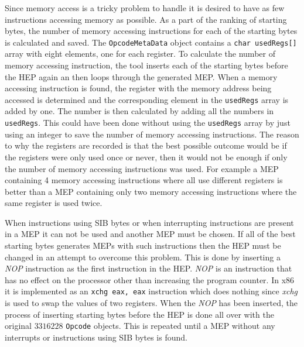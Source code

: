 \documentclass[11pt,twoside]{eitExjobb}
\begin{document}
\noindent Since memory access is a tricky problem to handle it is desired to have as few instructions accessing memory as possible. As a part of the ranking of starting bytes, the number of memory accessing instructions for each of the starting bytes is calculated and saved. The \texttt{OpcodeMetaData} object contains a \texttt{char usedRegs[]} array with eight elements, one for each register. To calculate the number of memory accessing instruction, the tool inserts each of the starting bytes before the HEP again an then loops through the generated MEP. When a memory accessing instruction is found, the register with the memory address being accessed is determined and the corresponding element in the \texttt{usedRegs} array is added by one. The number is then calculated by adding all the numbers in \texttt{usedRegs}. This could have been done without using the \texttt{usedRegs} array by just using an integer to save the number of memory accessing instructions. The reason to why the registers are recorded is that the best possible outcome would be if the registers were only used once or never, then it would not be enough if only the number of memory accessing instructions was used. For example a MEP containing 4 memory accessing instructions where all use different registers is better than a MEP containing only two memory accessing instructions where the same register is used twice.

When instructions using SIB bytes or when interrupting instructions are present in a MEP it can not be used and another MEP must be chosen. If all of the best starting bytes generates MEPs with such instructions then the HEP must be changed in an attempt to overcome this problem. This is done by inserting a \emph{NOP} instruction as the first instruction in the HEP. \emph{NOP} is an instruction that has no effect on the processor other than increasing the program counter. In x86 it is implemented as an \texttt{xchg eax, eax} instruction which does nothing since \emph{xchg} is used to swap the values of two registers. When the \emph{NOP} has been inserted, the process of inserting starting bytes before the HEP is done all over with the original $3316228$ \texttt{Opcode} objects. This is repeated until a MEP without any interrupts or instructions using SIB bytes is found.
\end{document}

